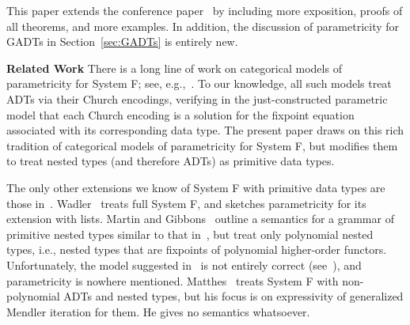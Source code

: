 \documentclass{lmcs}
\theoremstyle{plain}\newtheorem{satz}[thm]{Satz}
\begin{document}
{This paper extends the conference paper~\cite{jgj21} by including more
exposition, proofs of all theorems, and more examples. In addition,
the discussion of parametricity for GADTs in Section~\ref{sec:GADTs}
is entirely new.

\vspace*{0.05in}

\noindent
{\bf Related Work}\/ There is a long line of work on categorical
models of parametricity for System F; see,
e.g.,~\cite{bfss90,bm05,dr04,gjfor15,has94,jac99,mr92,rr94}.  To our
knowledge, all such models treat ADTs via their Church encodings,
verifying in the just-constructed parametric model that each Church
encoding is a solution for the fixpoint equation associated with its
corresponding data type. The present paper draws on this rich
tradition of categorical models of parametricity for System F, but
modifies them to treat nested types (and therefore ADTs) as primitive
data types.

The only other extensions we know of System F with primitive data
types are those in~\cite{mat11,mg01,pit98,pit00,wad89}.
Wadler~\cite{wad89} treats full System F, and sketches parametricity
for its extension with lists. Martin and Gibbons~\cite{mg01} outline a
semantics for a grammar of primitive nested types similar to that
in~\cite{jp19}, but treat only polynomial nested types, i.e., nested
types that are fixpoints of polynomial higher-order
functors. Unfortunately, the model suggested in~\cite{mg01} is not
entirely correct (see~\cite{jp19}), and parametricity is nowhere
mentioned.  Matthes~\cite{mat11} treats System F with non-polynomial
ADTs and nested types, but his focus is on expressivity of generalized
Mendler iteration for them. He gives no semantics whatsoever.

}
\end{document}
